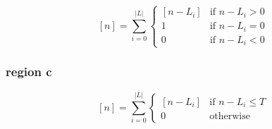 \documentclass[a4paper, 11pt]{article}
\begin{document}
\[
	[n] = \sum_{i=0}^{\vert L \vert}
		\begin{cases}
			[n - L_i]	& \text{if $n - L_i > 0$} \\
			1		& \text{if $n - L_i = 0$} \\
			0		& \text{if $n - L_i < 0$}
		 \end{cases}
\]

\subsubsection{region c}

\[
	[n] = \sum_{i=0}^{\vert L \vert}
		\begin{cases}
			[n - L_i]	& \text{if $n - L_i \leq T$} \\
			0		& \text{otherwise}
			
		 \end{cases}
\]
\end{document}

